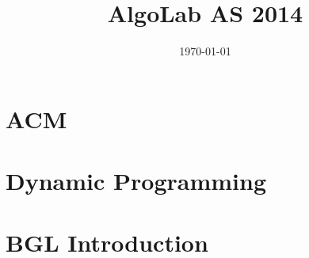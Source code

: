 \documentclass[a4paper,titlepage]{article}
\author{}
\title{AlgoLab AS 2014}
\date{\today}
\newcommand{\topic}[1]{\index{#1}#1}
\newcommand{\expdf}[3]{\newpage}
\begin{document}
\maketitle
\tableofcontents
\newpage
\setcounter{page}{1}

\newpage\section{ACM}
\expdf{Even Pairs}{\topic{test1}, \topic{test2}}{even-pairs/even_pairs.pdf}


\expdf{Build The Sum}{\topic{test1}, \topic{test2}}{build-the-sum/build_sum.pdf}


\expdf{Shelves}{}{shelves/shelves.pdf}


\expdf{Checking Change}{}{checking-change/checking_change.pdf}


\expdf{Even Matrices}{}{even-matrices/even_matrices.pdf}

\expdf{Race Tracks}{}{race-tracks/race_tracks.pdf}


\expdf{Boats}{}{boats/boats.pdf}


\expdf{Aliens}{}{aliens/aliens.pdf}


\expdf{Next Path}{}{next-path/next_path.pdf}


\newpage\section{Dynamic Programming}
\expdf{Longest Path}{}{longest-path/longest_path.pdf}


\expdf{Light Pattern}{}{light-pattern/light_pattern.pdf}


\expdf{Burning Coins}{}{burning-coins/burning_coins.pdf}


\expdf{Poker Chips}{}{pokerchips/poker_chips.pdf}


\newpage\section{BGL Introduction}
\expdf{Building a Graph}{}{building-a-graph/bgl_intro.pdf}
\end{document}
